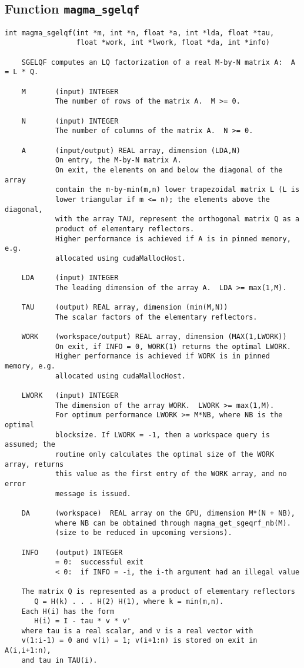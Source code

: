 \documentclass[10pt]{book}
\begin{document}
\subsection{Function {\tt {\bf magma\_sgelqf}}}
\begin{verbatim}
int magma_sgelqf(int *m, int *n, float *a, int *lda, float *tau,
                 float *work, int *lwork, float *da, int *info)

    SGELQF computes an LQ factorization of a real M-by-N matrix A:  A = L * Q.

    M       (input) INTEGER
            The number of rows of the matrix A.  M >= 0.

    N       (input) INTEGER
            The number of columns of the matrix A.  N >= 0.

    A       (input/output) REAL array, dimension (LDA,N)
            On entry, the M-by-N matrix A.
            On exit, the elements on and below the diagonal of the array
            contain the m-by-min(m,n) lower trapezoidal matrix L (L is
            lower triangular if m <= n); the elements above the diagonal,
            with the array TAU, represent the orthogonal matrix Q as a
            product of elementary reflectors.
            Higher performance is achieved if A is in pinned memory, e.g.
            allocated using cudaMallocHost.

    LDA     (input) INTEGER
            The leading dimension of the array A.  LDA >= max(1,M).

    TAU     (output) REAL array, dimension (min(M,N))
            The scalar factors of the elementary reflectors.

    WORK    (workspace/output) REAL array, dimension (MAX(1,LWORK))
            On exit, if INFO = 0, WORK(1) returns the optimal LWORK.
            Higher performance is achieved if WORK is in pinned memory, e.g.
            allocated using cudaMallocHost.

    LWORK   (input) INTEGER
            The dimension of the array WORK.  LWORK >= max(1,M).
            For optimum performance LWORK >= M*NB, where NB is the optimal 
            blocksize. If LWORK = -1, then a workspace query is assumed; the 
            routine only calculates the optimal size of the WORK array, returns
            this value as the first entry of the WORK array, and no error
            message is issued.

    DA      (workspace)  REAL array on the GPU, dimension M*(N + NB),
            where NB can be obtained through magma_get_sgeqrf_nb(M).
            (size to be reduced in upcoming versions).

    INFO    (output) INTEGER
            = 0:  successful exit
            < 0:  if INFO = -i, the i-th argument had an illegal value

    The matrix Q is represented as a product of elementary reflectors
       Q = H(k) . . . H(2) H(1), where k = min(m,n).
    Each H(i) has the form
       H(i) = I - tau * v * v'
    where tau is a real scalar, and v is a real vector with
    v(1:i-1) = 0 and v(i) = 1; v(i+1:n) is stored on exit in A(i,i+1:n),
    and tau in TAU(i).
\end{verbatim}
\end{document}
